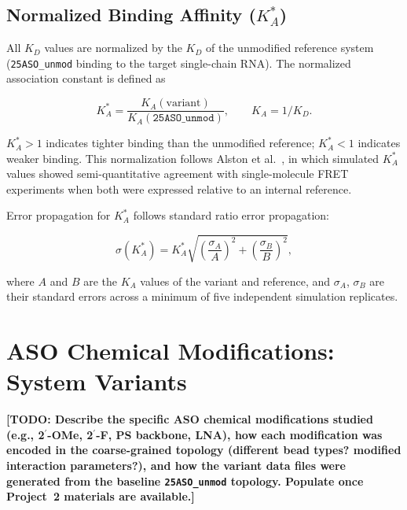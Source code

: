 \subsection{Normalized Binding Affinity ($K_A^*$)}
\label{sec:KA_star}

All $K_D$ values are normalized by the $K_D$ of the unmodified
reference system (\texttt{25ASO\_unmod} binding to the target
single-chain RNA).
The normalized association constant is defined as

\begin{equation}
  K_A^* = \frac{K_A(\text{variant})}{K_A(\texttt{25ASO\_unmod})},
  \qquad K_A = 1/K_D.
  \label{eq:KA_star}
\end{equation}

$K_A^* > 1$ indicates tighter binding than the unmodified reference;
$K_A^* < 1$ indicates weaker binding.
This normalization follows Alston et al.~\cite{Alston2023}, in which
simulated $K_A^*$ values showed semi-quantitative agreement with
single-molecule FRET experiments when both were expressed relative to
an internal reference.

Error propagation for $K_A^*$ follows standard ratio error propagation:

\begin{equation}
  \sigma(K_A^*) = K_A^* \sqrt{\left(\frac{\sigma_A}{A}\right)^2
    + \left(\frac{\sigma_B}{B}\right)^2},
  \label{eq:error_prop}
\end{equation}

where $A$ and $B$ are the $K_A$ values of the variant and reference,
and $\sigma_A$, $\sigma_B$ are their standard errors across a minimum
of five independent simulation replicates.

\section{ASO Chemical Modifications: System Variants}
\label{sec:aso_variants}

\textbf{[TODO: Describe the specific ASO chemical modifications studied
(e.g., 2$^\prime$-OMe, 2$^\prime$-F, PS backbone, LNA), how each
modification was encoded in the coarse-grained topology (different bead
types? modified interaction parameters?), and how the variant data files
were generated from the baseline \texttt{25ASO\_unmod} topology.
Populate once Project~2 materials are available.]}

